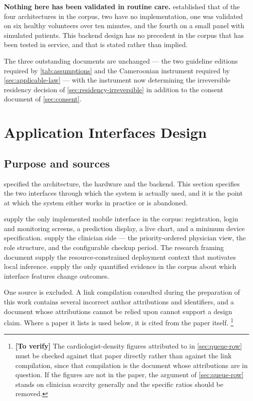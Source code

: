 \documentclass[12pt,a4paper,oneside]{report}
\newcommand{\verify}[1]{\footnote{\textbf{[To verify]} #1}}
\begin{document}
\textbf{Nothing here has been validated in routine care.}  established that of the four architectures in the corpus, two have no implementation, one was validated on six healthy volunteers over ten minutes, and the fourth on a small panel with simulated patients. This backend design has no precedent in the corpus that has been tested in service, and that is stated rather than implied.

The three outstanding documents are unchanged --- the two guideline editions required by \cref{tab:assumptions} and the Cameroonian instrument required by \cref{sec:applicable-law} --- with the instrument now determining the irreversible residency decision of \cref{sec:residency-irreversible} in addition to the consent document of \cref{sec:consent}.

\section{Application Interfaces Design}\label{sec:interfaces}

\subsection*{Purpose and sources}

 specified the architecture, the hardware and the backend. This section specifies the two interfaces through which the system is actually used, and it is the point at which the system either works in practice or is abandoned.

\Textcite{efendi2025} supply the only implemented mobile interface in the corpus: registration, login and monitoring screens, a prediction display, a live chart, and a minimum device specification. \Textcite{yazdani2018} supply the clinician side --- the priority-ordered physician view, the role structure, and the configurable checkup period. The research framing document supply the resource-constrained deployment context that motivates local inference. \Textcite{zhou2024} supply the only quantified evidence in the corpus about which interface features change outcomes.

One source is excluded. A link compilation consulted during the preparation of this work contains several incorrect author attributions and identifiers, and a document whose attributions cannot be relied upon cannot support a design claim. Where a paper it lists is used below, it is cited from the paper itself.%
\verify{The cardiologist-density figures attributed to \textcite{segun2025} in \cref{sec:queue-row} must be checked against that paper directly rather than against the link compilation, since that compilation is the document whose attributions are in question. If the figures are not in the paper, the argument of \cref{sec:queue-row} stands on clinician scarcity generally and the specific ratios should be removed.}
\end{document}
